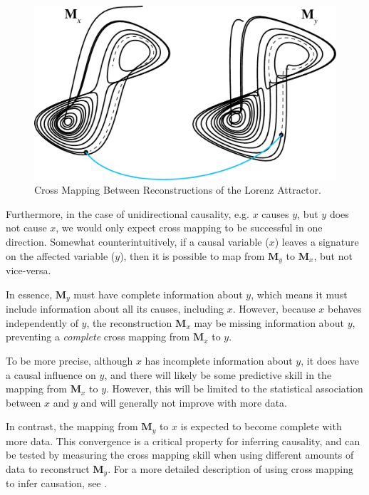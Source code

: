 \documentclass[article]{jss}
\begin{document}
\begin{figure}[t!]
\begin{center}
\includegraphics{figure_3}
\end{center}
\caption{\label{fig:cross-mapping} Cross Mapping Between Reconstructions of the Lorenz Attractor.}
\end{figure}

Furthermore, in the case of unidirectional causality, e.g. $x$ causes $y$, but $y$ does not cause $x$, we would only expect cross mapping to be successful in one direction. Somewhat counterintuitively, if a causal variable ($x$) leaves a signature on the affected variable ($y$), then it is possible to map from $\mathbf{M}_y$ to $\mathbf{M}_x$, but not vice-versa.

In essence, $\mathbf{M}_y$ must have complete information about $y$, which means it must include information about all its causes, including $x$. However, because $x$ behaves independently of $y$, the reconstruction $\mathbf{M}_x$ may be missing information about $y$, preventing a \emph{complete} cross mapping from $\mathbf{M}_x$ to $y$.

To be more precise, although $x$ has incomplete information about $y$, it does have a causal influence on $y$, and there will likely be some predictive skill in the mapping from $\mathbf{M}_x$ to $y$. However, this will be limited to the statistical association between $x$ and $y$ and will generally not improve with more data.

In contrast, the mapping from $\mathbf{M}_y$ to $x$ is expected to become complete with more data. This convergence is a critical property for inferring causality, and can be tested by measuring the cross mapping skill when using different amounts of data to reconstruct $\mathbf{M}_y$. For a more detailed description of using cross mapping to infer causation, see \citet{Sugihara_2012, Ye_2015a}.
\end{document}

